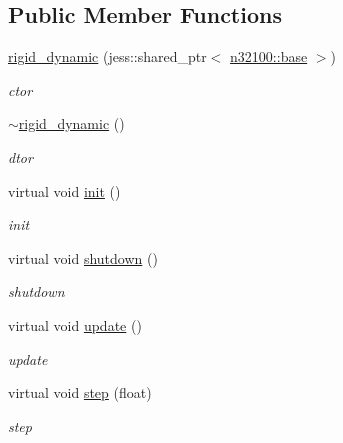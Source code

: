 \subsection*{Public Member Functions}
\begin{DoxyCompactItemize}
\item 
\hyperlink{classnebula_1_1content_1_1actor_1_1admin_1_1rigid__dynamic_a364eb2411552dfbb57ee49dba81a7aa2}{rigid\_\-dynamic} (jess::shared\_\-ptr$<$ \hyperlink{classnebula_1_1content_1_1scene_1_1admin_1_1base}{n32100::base} $>$)
\begin{DoxyCompactList}\small\item\em ctor \item\end{DoxyCompactList}\item 
\hyperlink{classnebula_1_1content_1_1actor_1_1admin_1_1rigid__dynamic_a7385f4e3b6028aac11d75a98fcdf89dd}{$\sim$rigid\_\-dynamic} ()
\begin{DoxyCompactList}\small\item\em dtor \item\end{DoxyCompactList}\item 
virtual void \hyperlink{classnebula_1_1content_1_1actor_1_1admin_1_1rigid__dynamic_af30bd690cfa2d1a98b1458c658dc97d6}{init} ()
\begin{DoxyCompactList}\small\item\em init \item\end{DoxyCompactList}\item 
virtual void \hyperlink{classnebula_1_1content_1_1actor_1_1admin_1_1rigid__dynamic_a6b7e8768902a320d8f7f483cf348a059}{shutdown} ()
\begin{DoxyCompactList}\small\item\em shutdown \item\end{DoxyCompactList}\item 
virtual void \hyperlink{classnebula_1_1content_1_1actor_1_1admin_1_1rigid__dynamic_a2bf9e18773b7db87cb35fef56274405a}{update} ()
\begin{DoxyCompactList}\small\item\em update \item\end{DoxyCompactList}\item 
virtual void \hyperlink{classnebula_1_1content_1_1actor_1_1admin_1_1rigid__dynamic_ae5350e2820c0e00c36c663fc63a8b83c}{step} (float)
\begin{DoxyCompactList}\small\item\em step \item\end{DoxyCompactList}\item 

\end{DoxyCompactItemize}
